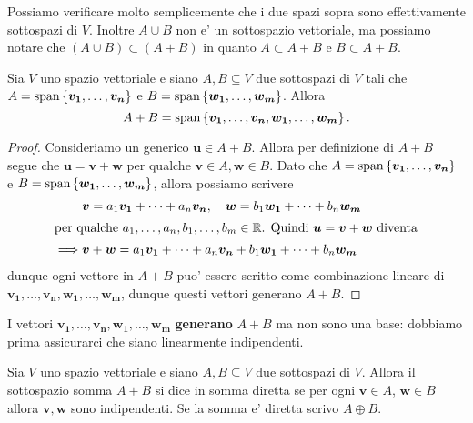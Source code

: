 \begin{remark}
    Possiamo verificare molto semplicemente che i due spazi sopra sono effettivamente sottospazi di $V$. Inoltre $A \cup B$ non e' un sottospazio vettoriale, ma possiamo notare che $(A \cup B) \subset (A + B)$ in quanto $A \subset A + B$ e $B \subset A + B$.
\end{remark}

\begin{proposition}
    Sia $V$ uno spazio vettoriale e siano $A, B \subseteq V$ due sottospazi di $V$ tali che $A = \operatorname{span}\left\{\bm{v_1}, \dots, \bm{v_n}\right\}$ e $B = \operatorname{span}\left\{\bm{w_1}, \dots, \bm{w_m}\right\}$. Allora \begin{equation}
        A + B = \operatorname{span}\left\{\bm{v_1}, \dots, \bm{v_n}, \bm{w_1}, \dots, \bm{w_m}\right\}.
    \end{equation}
\end{proposition}
\begin{proof}
    Consideriamo un generico $\bm u \in A + B$. Allora per definizione di $A + B$ segue che $\bm u = \bm v + \bm w$ per qualche $\bm v \in A, \bm w \in B$.
    Dato che $A = \operatorname{span}\left\{\bm{v_1}, \dots, \bm{v_n}\right\}$ e $B = \operatorname{span}\left\{\bm{w_1}, \dots, \bm{w_m}\right\}$, allora possiamo scrivere 
    \begin{alignat*}{1}
        &\bm v = a_1\bm{v_1} + \dots + a_n\bm{v_n},  \quad \bm w = b_1\bm{w_1} + \dots + b_n\bm{w_m} \\
        \intertext{per qualche $a_1, \dots, a_n, b_1, \dots, b_m \in \mathbb{R}$. Quindi $\bm u = \bm v + \bm w$ diventa}
        \implies &\bm v + \bm w = a_1\bm{v_1} + \dots + a_n\bm{v_n} + b_1\bm{w_1} + \dots + b_n\bm{w_m}
    \end{alignat*}
    dunque ogni vettore in $A + B$ puo' essere scritto come combinazione lineare di $\bm{v_1}, \dots, \bm{v_n}, \bm{w_1}, \dots, \bm{w_m}$, dunque questi vettori generano $A + B$. 
\end{proof}

\begin{remark}
    I vettori $\bm{v_1}, \dots, \bm{v_n}, \bm{w_1}, \dots, \bm{w_m}$ \textbf{generano} $A+B$ ma non sono una base: dobbiamo prima assicurarci che siano linearmente indipendenti.
\end{remark}

\begin{definition}
    Sia $V$ uno spazio vettoriale e siano $A, B \subseteq V$ due sottospazi di $V$. Allora il sottospazio somma $A + B$ si dice in somma diretta se per ogni $\bm v \in A$, $\bm w \in B$ allora $\bm v, \bm w$ sono indipendenti. Se la somma e' diretta scrivo $A \oplus B$.
\end{definition}

